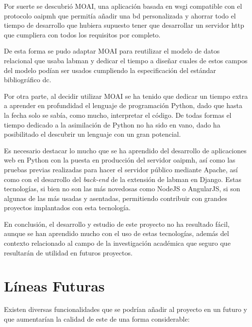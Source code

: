 Por suerte se descubrió MOAI, una aplicación basada en \acrshort{wsgi} compatible con el protocolo \acrshort{oaipmh} que permitía añadir una \acrshort{bd} personalizada y ahorrar todo el tiempo de desarrollo que hubiera supuesto tener que desarrollar un servidor \acrshort{http} que cumpliera con todos los requisitos por completo.

De esta forma se pudo adaptar MOAI para reutilizar el modelo de datos relacional que usaba \acrshort{labman} y dedicar el tiempo a diseñar cuales de estos campos del modelo podían ser usados cumpliendo la especificación del estándar bibliográfico \acrshort{dc}.

Por otra parte, al decidir utilizar MOAI se ha tenido que dedicar un tiempo extra a aprender en profundidad el lenguaje de programación Python, dado que hasta la fecha solo se sabía, como mucho, interpretar el código. De todas formas el tiempo dedicado a la asimilación de Python no ha sido en vano, dado ha posibilitado el descubrir un lenguaje con un gran potencial.

Es necesario destacar lo mucho que se ha aprendido del desarrollo de aplicaciones web en Python con la puesta en producción del servidor \acrshort{oaipmh}, así como las pruebas previas realizadas para hacer el servidor público mediante Apache, así como con el desarrollo del \textit{back-end} de la extensión de \acrshort{labman} en Django. Estas tecnologías, si bien no son las más novedosas como NodeJS\cite{NodeJS} o AngularJS\cite{AngularJS}, si son algunas de las más usadas y asentadas, permitiendo contribuir con grandes proyectos implantados con esta tecnología.

En conclusión, el desarrollo y estudio de este proyecto no ha resultado fácil, aunque se han aprendido mucho con el uso de estas tecnologías, además del contexto relacionado al campo de la investigación académica que seguro que resultarán de utilidad en futuros proyectos.

\section{Líneas Futuras}

Existen diversas funcionalidades que se podrían añadir al proyecto en un futuro y que aumentarían la calidad de este de una forma considerable:

